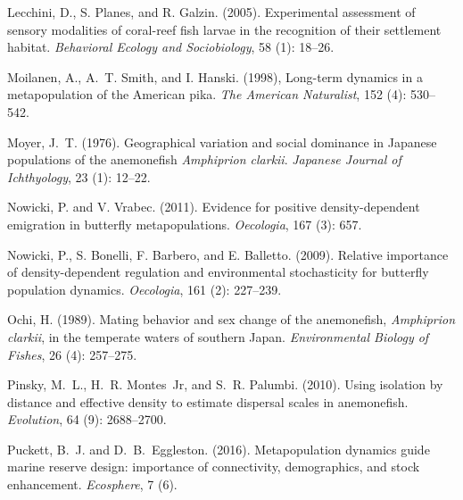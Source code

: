 \documentclass[12pt, oneside]{article}   	%
\begin{document}
\begin{thebibliography}{66}
Lecchini, D., S. Planes, and R. Galzin. (2005).
\newblock Experimental assessment of sensory modalities of coral-reef fish
  larvae in the recognition of their settlement habitat.
\newblock \emph{Behavioral Ecology and Sociobiology}, 58 (1):
  18--26.

Moilanen, A., A.~T. Smith, and I. Hanski. (1998),
\newblock Long-term dynamics in a metapopulation of the American pika.
\newblock \emph{The American Naturalist}, 152 (4): 530--542.

Moyer, J.~T. (1976).
\newblock Geographical variation and social dominance in Japanese populations
  of the anemonefish \textit{Amphiprion clarkii}.
\newblock \emph{Japanese Journal of Ichthyology}, 23 (1):
  12--22.

Nowicki, P. and V. Vrabec. (2011).
\newblock Evidence for positive density-dependent emigration in butterfly
  metapopulations.
\newblock \emph{Oecologia}, 167 (3): 657.

Nowicki, P., S. Bonelli, F. Barbero, and E. Balletto. (2009).
\newblock Relative importance of density-dependent regulation and environmental
  stochasticity for butterfly population dynamics.
\newblock \emph{Oecologia}, 161 (2): 227--239.

Ochi, H. (1989).
\newblock Mating behavior and sex change of the anemonefish, \textit{Amphiprion
  clarkii}, in the temperate waters of southern Japan.
\newblock \emph{Environmental Biology of Fishes}, 26 (4):
  257--275.

Pinsky, M.~L., H.~R. Montes~Jr, and S.~R. Palumbi. (2010).
\newblock Using isolation by distance and effective density to estimate
  dispersal scales in anemonefish.
\newblock \emph{Evolution}, 64 (9): 2688--2700.

Puckett, B.~J. and D.~B.~Eggleston. (2016).
\newblock Metapopulation dynamics guide marine reserve design: importance of
  connectivity, demographics, and stock enhancement.
\newblock \emph{Ecosphere}, 7 (6).


\end{thebibliography}
\end{document}
